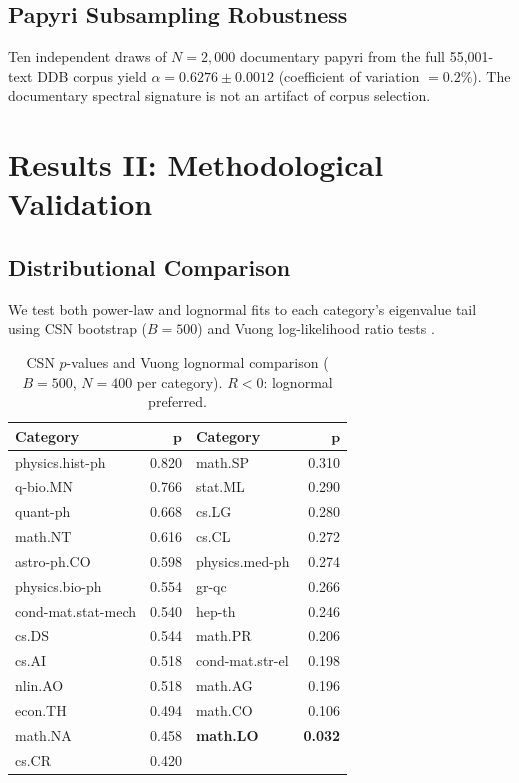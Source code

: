\documentclass[12pt,letterpaper]{article}
\newcommand{\al}{\alpha}
\begin{document}
\subsection{Papyri Subsampling Robustness}

Ten independent draws of $N = 2{,}000$ documentary papyri from the
full 55{,}001-text DDB corpus yield $\al = 0.6276 \pm 0.0012$
(coefficient of variation $= 0.2\%$).  The documentary spectral
signature is not an artifact of corpus selection.


\section{Results II: Methodological Validation}
\label{sec:validation}

\subsection{Distributional Comparison}
\label{sec:ks}

We test both power-law and lognormal fits to each category's
eigenvalue tail using CSN bootstrap ($B = 500$) and Vuong
log-likelihood ratio tests \citep{clauset2009}.

\begin{table}[H]
\centering
\caption{CSN $p$-values and Vuong lognormal comparison ($B=500$,
$N=400$ per category).  $R < 0$: lognormal preferred.}
\label{tab:ks}
\begin{tabular}{lr|lr}
\toprule
\textbf{Category} & $\boldsymbol{p}$ & \textbf{Category} &
$\boldsymbol{p}$ \\
\midrule
physics.hist-ph & 0.820 & math.SP & 0.310 \\
q-bio.MN & 0.766 & stat.ML & 0.290 \\
quant-ph & 0.668 & cs.LG & 0.280 \\
math.NT & 0.616 & cs.CL & 0.272 \\
astro-ph.CO & 0.598 & physics.med-ph & 0.274 \\
physics.bio-ph & 0.554 & gr-qc & 0.266 \\
cond-mat.stat-mech & 0.540 & hep-th & 0.246 \\
cs.DS & 0.544 & math.PR & 0.206 \\
cs.AI & 0.518 & cond-mat.str-el & 0.198 \\
nlin.AO & 0.518 & math.AG & 0.196 \\
econ.TH & 0.494 & math.CO & 0.106 \\
math.NA & 0.458 & \textbf{math.LO} & \textbf{0.032} \\
cs.CR & 0.420 & & \\
\bottomrule
\end{tabular}
\end{table}
\end{document}
